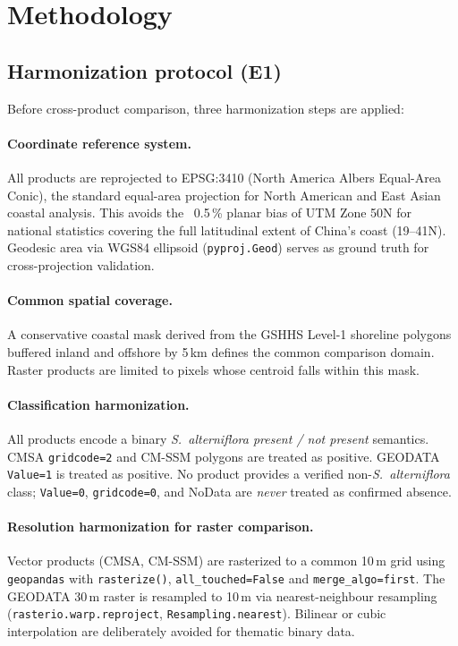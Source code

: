 \documentclass[11pt]{article}
\begin{document}
\section{Methodology}
\label{sec:methods}

\subsection{Harmonization protocol (E1)}
\label{sec:methods-harm}

Before cross-product comparison, three harmonization steps are applied:

\paragraph{Coordinate reference system.} All products are reprojected to EPSG:3410
(North America Albers Equal-Area Conic), the standard equal-area projection for
North American and East Asian coastal analysis. This avoids the ~0.5\,\% planar
bias of UTM Zone 50N for national statistics covering the full latitudinal
extent of China's coast (19--41\textdegree{}N). Geodesic area via WGS84 ellipsoid
(\texttt{pyproj.Geod}) serves as ground truth for cross-projection validation.

\paragraph{Common spatial coverage.} A conservative coastal mask derived from the
GSHHS Level-1 shoreline polygons\citep{wessel_1996_gshhs} buffered inland and
offshore by 5\,km defines the common comparison domain. Raster products are
limited to pixels whose centroid falls within this mask.

\paragraph{Classification harmonization.} All products encode a binary
\textit{S.~alterniflora present / not present} semantics. CMSA \texttt{gridcode=2}
and CM-SSM polygons are treated as positive. GEODATA \texttt{Value=1} is
treated as positive. No product provides a verified non-\textit{S.~alterniflora}
class; \texttt{Value=0}, \texttt{gridcode=0}, and NoData are \emph{never} treated
as confirmed absence.

\paragraph{Resolution harmonization for raster comparison.} Vector products (CMSA,
CM-SSM) are rasterized to a common 10\,m grid using \texttt{geopandas} with
\texttt{rasterize()}, \texttt{all\_touched=False} and \texttt{merge\_algo=first}.
The GEODATA 30\,m raster is resampled to 10\,m via nearest-neighbour
resampling (\texttt{rasterio.warp.reproject}, \texttt{Resampling.nearest}).
Bilinear or cubic interpolation are deliberately avoided for thematic binary
data.
\end{document}
